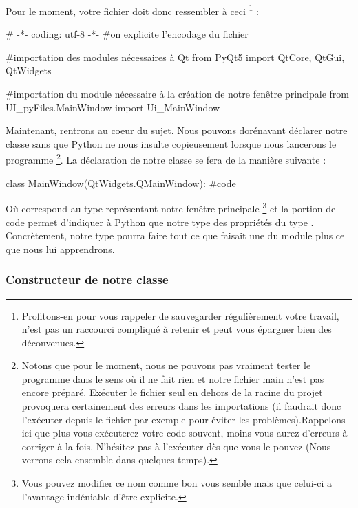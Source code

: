 Pour le moment, votre fichier doit donc ressembler à ceci
\footnote{ Profitons-en pour vous rappeler de sauvegarder régulièrement votre travail,  n'est pas un raccourci compliqué à retenir et peut vous épargner bien des déconvenues.}
:
\begin{Python}
# -*- coding: utf-8 -*-
#on explicite l’encodage du fichier

#importation des modules nécessaires à Qt
from PyQt5 import QtCore, QtGui, QtWidgets

#importation du module nécessaire à la création de notre fenêtre principale
from UI_pyFiles.MainWindow import Ui_MainWindow
\end{Python}


Maintenant, rentrons au coeur du sujet. Nous pouvons dorénavant déclarer notre classe sans que Python ne nous insulte copieusement lorsque nous lancerons le programme
\footnote{Notons que pour le moment, nous ne pouvons pas vraiment tester le programme dans le sens où il ne fait rien et notre fichier main n'est pas encore préparé. Exécuter le fichier seul en dehors de la racine du projet provoquera certainement des erreurs dans les importations (il faudrait donc l'exécuter depuis le fichier  par exemple pour éviter les problèmes).\newline Rappelons ici que plus vous exécuterez votre code souvent, moins vous aurez d'erreurs à corriger à la fois. N'hésitez pas à l'exécuter dès que vous le pouvez (Nous verrons cela ensemble dans quelques temps).}.\newline
La déclaration de notre classe se fera de la manière suivante :
\begin{Python}
class MainWindow(QtWidgets.QMainWindow):
    #code
\end{Python}
Où  correspond au type représentant notre fenêtre principale
\footnote
{Vous pouvez modifier ce nom comme bon vous semble mais que celui-ci a l'avantage indéniable d'être explicite.}
et la portion de code  permet d'indiquer à Python que notre type   des propriétés du type .\newline
Concrètement, notre type pourra faire tout ce que faisait une  du module  plus ce que nous lui apprendrons.


\subsubsection{Constructeur de notre classe}

